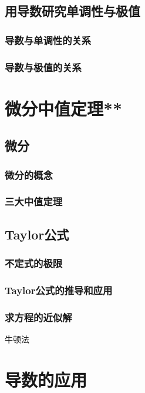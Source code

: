 \section{用导数研究单调性与极值}
\subsection{导数与单调性的关系}
\clearpage
\subsection{导数与极值的关系}
\clearpage

\chapter{微分中值定理**}
\section{微分}
\subsection{微分的概念}
\clearpage
\subsection{三大中值定理}
\clearpage
\section{Taylor公式}
\subsection{不定式的极限}
\clearpage
\subsection{Taylor公式的推导和应用}
\clearpage

\subsection{求方程的近似解}
\clearpage
牛顿法


\chapter{导数的应用}
